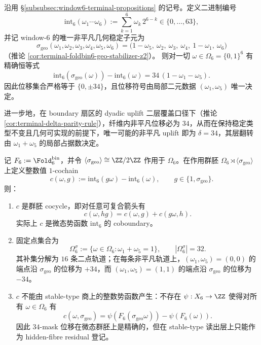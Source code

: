 \begin{corollary}\label{cor:foldbin6-geo-mask-34}
沿用 \S\ref{subsubsec:window6-terminal-propositions} 的记号。定义二进制编号
\[
\mathrm{int}_6(\omega_1\cdots\omega_6):=\sum_{k=1}^6 \omega_k\,2^{6-k}\in\{0,\dots,63\},
\]
并记 window-\(6\) 的唯一非平凡几何稳定子元为
\[
\sigma_{\mathrm{geo}}(\omega_1,\omega_2,\omega_3,\omega_4,\omega_5,\omega_6)
=\bigl(1-\omega_5,\ \omega_2,\ \omega_3,\ \omega_4,\ 1-\omega_1,\ \omega_6\bigr)
\]
（推论 \ref{cor:terminal-foldbin6-geo-stabilizer-z2}）。
则对一切 \(\omega\in\Omega_6=\{0,1\}^6\) 有精确恒等式
\[
\mathrm{int}_6(\sigma_{\mathrm{geo}}(\omega))-\mathrm{int}_6(\omega)
=34\,(1-\omega_1-\omega_5).
\]
因此位移集合严格等于 \(\{0,\pm 34\}\)，且位移符号由局部二元数据 \((\omega_1,\omega_5)\) 唯一决定。

进一步地，在 boundary 扇区的 dyadic uplift 二层覆盖口径下（推论 \ref{cor:terminal-delta-parity-rule}），纤维内非平凡位移必为 \(34\)，从而在保持稳定类型不变且几何可实现的前提下，唯一可能的非平凡 uplift 即为 \(\delta=34\)，其层翻转由 \(\omega_1+\omega_5\) 的局部占据数决定。
\end{corollary}
\begin{proposition}\label{prop:distill-stallings-window6-mask-cocycle-hidden-fibre-residue}
记 \(F_6:=\Fold_6^{\mathrm{bin}}\)，并令 \(\langle\sigma_{\mathrm{geo}}\rangle\cong\ZZ/2\ZZ\) 作用于 \(\Omega_6\)。在作用群胚 \(\Omega_6\rtimes\langle\sigma_{\mathrm{geo}}\rangle\) 上定义整数值 \(1\)-cochain
\[
c(\omega,g):=\mathrm{int}_6(g\omega)-\mathrm{int}_6(\omega),
\qquad g\in\{1,\sigma_{\mathrm{geo}}\}.
\]
则：
\begin{enumerate}
  \item \(c\) 是群胚 cocycle，即对任意可复合箭头有
  \[
  c(\omega,hg)=c(\omega,g)+c(g\omega,h).
  \]
  实际上 \(c\) 是微态势函数 \(\mathrm{int}_6\) 的 coboundary。
  \item 固定点集合为
  \[
  \Omega_6^{\sigma}:=\{\omega\in\Omega_6:\omega_1+\omega_5=1\},
  \qquad |\Omega_6^{\sigma}|=32.
  \]
  其补集分解为 \(16\) 条二点轨道；在每条非平凡轨道上，\((\omega_1,\omega_5)=(0,0)\) 的端点沿 \(\sigma_{\mathrm{geo}}\) 的位移为 \(+34\)，而 \((\omega_1,\omega_5)=(1,1)\) 的端点沿 \(\sigma_{\mathrm{geo}}\) 的位移为 \(-34\)。
  \item \(c\) 不能由 stable-type 商上的整数势函数产生：不存在 \(\psi:X_6\to\ZZ\) 使得对所有 \(\omega\in\Omega_6\) 有
  \[
  c(\omega,\sigma_{\mathrm{geo}})
  =\psi(F_6(\sigma_{\mathrm{geo}}\omega))-\psi(F_6(\omega)).
  \]
  因此 \(34\)-mask 位移在微态群胚上是精确的，但在 stable-type 读出层上只能作为 hidden-fibre residual 登记。
\end{enumerate}
\end{proposition}
